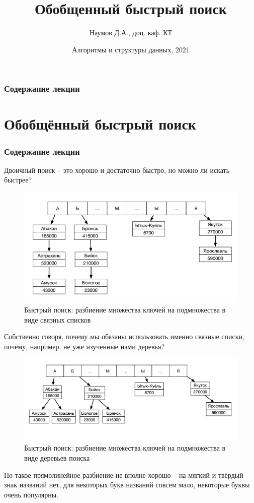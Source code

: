 \documentclass{beamer}
\title[Хэш-функции]{Обобщенный быстрый поиск}
\author{Наумов Д.А., доц. каф. КТ}
\date[27.04.2021] {Алгоритмы и структуры данных, 2021}
\begin{document}
\begin{frame}
  \titlepage
\end{frame}
  
\begin{frame}
  \frametitle{Содержание лекции}
  \tableofcontents  
\end{frame}

\section{Обобщённый быстрый поиск}

\begin{frame}
  \frametitle{Содержание лекции}
  \tableofcontents[current]
\end{frame}
  
\begin{frame}[t]
	Двоичный поиск -- это хорошо и достаточно быстро, но можно ли искать быстрее?
	\begin{figure}[h]
		\centering
		\includegraphics[scale=0.6]{images/lec08-pic01.png}
		\caption{Быстрый поиск: разбиение множества ключей на подмножества в виде связных списков}
	\end{figure}
\end{frame}

\begin{frame}[t]
	Собственно говоря, почему мы обязаны использовать именно связные списки, почему, например, не уже изученные нами деревья?
	\begin{figure}[h]
		\centering
		\includegraphics[scale=0.7]{images/lec08-pic02.png}
		\caption{Быстрый поиск: разбиение множества ключей на подмножества в виде деревьев поиска}
	\end{figure}
	Но такое прямолинейное разбиение не вполне хорошо -- на мягкий и твёрдый знак названий нет, для некоторых букв названий совсем мало, некоторые буквы очень популярны.
\end{frame}
\end{document}
